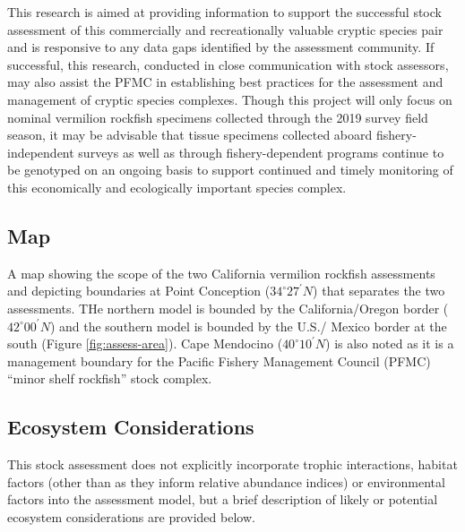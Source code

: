 \documentclass[
  english,
  a4paper,
]{article}
\begin{document}
This research is aimed at providing information to support the successful stock
assessment of this commercially and recreationally valuable cryptic species pair
and is responsive to any data gaps identified by the assessment community. If
successful, this research, conducted in close communication with stock assessors,
may also assist the PFMC in establishing best practices for the assessment and
management of cryptic species complexes. Though this project will only focus
on nominal vermilion rockfish specimens collected through the 2019 survey
field season, it may be advisable that tissue specimens collected aboard
fishery-independent surveys as well as through fishery-dependent programs
continue to be genotyped on an ongoing basis to support continued and timely
monitoring of this economically and ecologically important species complex.

\hypertarget{map}{%
\subsection{Map}\label{map}}

A map showing the scope of the two California vermilion rockfish assessments and depicting boundaries
at Point Conception ($34^\circ 27^\prime N$) that separates the two assessments. THe northern
model is bounded by the California/Oregon border ($42^\circ 00^\prime N$) and the southern model is
bounded by the U.S./ Mexico border at the south (Figure \ref{fig:assess-area}).
Cape Mendocino ($40^\circ 10^\prime N$) is also noted as it is a management boundary for the
Pacific Fishery Management Council (PFMC) ``minor shelf rockfish'' stock complex.

\hypertarget{ecosystem-considerations}{%
\subsection{Ecosystem Considerations}\label{ecosystem-considerations}}

This stock assessment does not explicitly incorporate trophic interactions,
habitat factors (other than as they inform relative abundance indices) or environmental
factors into the assessment model, but a brief description of likely or potential
ecosystem considerations are provided below.
\end{document}
